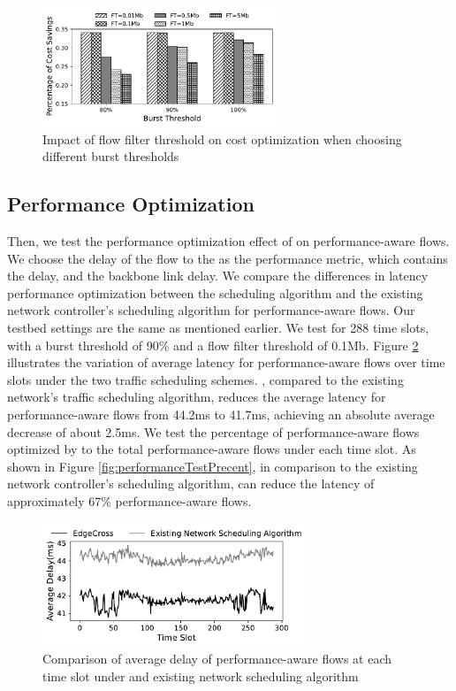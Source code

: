\begin{figure}
	\centering
	\includegraphics[width = 7cm]{figs/evaluation/costTestpara1.pdf}
	\caption{\small Impact of flow filter threshold on cost optimization when choosing different burst thresholds}
	\label{fig:costTestpara1}
\end{figure}




\subsection{Performance Optimization}
Then, we test the performance optimization effect of {\sys} on performance-aware flows. We choose the delay of the flow to the {\egress} as the performance metric, which contains the {\egress} delay, and the backbone link delay. We compare the differences in latency performance optimization between the {\sys} scheduling algorithm and the existing network controller's scheduling algorithm for performance-aware flows. Our testbed settings are the same as mentioned earlier. We test for 288 time slots, with a burst threshold of 90\% and a flow filter threshold of 0.1Mb. Figure \ref{fig:performanceTestAbs} illustrates the variation of average latency for performance-aware flows over time slots under the two traffic scheduling schemes. {\sys}, compared to the existing network's traffic scheduling algorithm, reduces the average latency for performance-aware flows from 44.2ms to 41.7ms, achieving an absolute average decrease of about 2.5ms. We test the percentage of performance-aware flows optimized by {\sys} to the total performance-aware flows under each time slot. As shown in Figure \ref{fig:performanceTestPrecent}, in comparison to the existing network controller's scheduling algorithm, {\sys} can reduce the latency of approximately 67\% performance-aware flows.

\begin{figure}
	\centering
	\includegraphics[width = 8cm]{figs/evaluation/performanceTestAbs.pdf}
	\caption{\small Comparison of average delay of performance-aware flows at each time slot under {\sys} and existing network scheduling algorithm}
	\label{fig:performanceTestAbs}
\end{figure}

